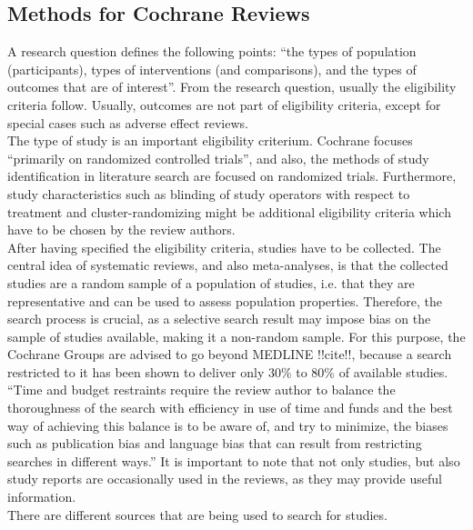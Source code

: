 \documentclass[11pt,a4paper,twoside]{book}\usepackage[]{graphicx}\usepackage[]{color}
\begin{document}
\subsection{Methods for Cochrane Reviews}
A research question defines the following points: ``the types of population (participants), types of interventions (and comparisons), and the types of outcomes that are of interest''. From the research question, usually the eligibility criteria follow. Usually, outcomes are not part of eligibility criteria, except for special cases such as adverse effect reviews. \\
The type of study is an important eligibility criterium. Cochrane focuses ``primarily on randomized controlled trials'', and also, the methods of study identification in literature search are focused on randomized trials. Furthermore, study characteristics such as blinding of study operators with respect to treatment and cluster-randomizing might be additional eligibility criteria which have to be chosen by the review authors. \\
After having specified the eligibility criteria, studies have to be collected. The central idea of systematic reviews, and also meta-analyses, is that the collected studies are a random sample of a population of studies, i.e. that they are representative and can be used to assess population properties. Therefore, the search process is crucial, as a selective search result may impose bias on the sample of studies available, making it a non-random sample. For this purpose, the Cochrane Groups are advised to go beyond MEDLINE !!cite!!, because a search restricted to it has been shown to deliver only 30\% to 80\% of available studies. ``Time and budget restraints require the review author to balance the thoroughness of the search with efficiency in use of time and funds and the best way of achieving this balance is to be aware of, and try to minimize, the biases such as publication bias and language bias that can result from restricting searches in different ways.'' It is important to note that not only studies, but also study reports are occasionally used in the reviews, as they may provide useful information. \\
There are different sources that are being used to search for studies. 
\end{document}
